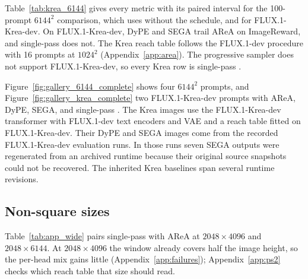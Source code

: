 Table~\ref{tab:krea_6144} gives every metric with its paired interval for the 100-prompt $6144^2$ comparison, which uses \sca{} without the schedule, and for FLUX.1-Krea-dev. On FLUX.1-Krea-dev, DyPE and SEGA trail AReA on ImageReward, and single-pass \sca{} does not. The Krea reach table follows the FLUX.1-dev procedure with 16 prompts at $1024^2$ (Appendix~\ref{app:area}). The progressive sampler does not support FLUX.1-Krea-dev, so every Krea row is single-pass \sca{}.

Figure~\ref{fig:gallery_6144_complete} shows four $6144^2$ prompts, and Figure~\ref{fig:gallery_krea_complete} two FLUX.1-Krea-dev prompts with AReA, DyPE, SEGA, and single-pass \sca{}. The Krea images use the FLUX.1-Krea-dev transformer with FLUX.1-dev text encoders and VAE and a reach table fitted on FLUX.1-Krea-dev. Their DyPE and SEGA images come from the recorded FLUX.1-Krea-dev evaluation runs. In those runs seven SEGA outputs were regenerated from an archived runtime because their original source snapshots could not be recovered. The inherited Krea baselines span several runtime revisions.


\subsection{Non-square sizes}
\label{app:wide}

Table~\ref{tab:app_wide} pairs single-pass \sca{} with AReA at $2048\times4096$ and $2048\times6144$. At $2048\times4096$ the window already covers half the image height, so the per-head mix gains little (Appendix~\ref{app:failures}); Appendix~\ref{app:ps2} checks which reach table that size should read.


